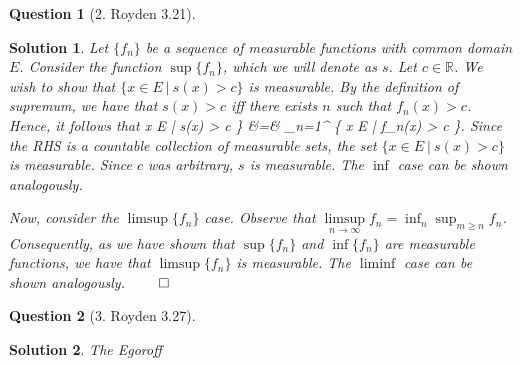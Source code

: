 \documentclass{article} %
\def\eQb#1\eQe{\begin{eqnarray*}#1\end{eqnarray*}}
\theoremstyle{quest}
\newtheorem*{question}{Question}
\newtheorem*{solution}{Solution}
\begin{document}
\pagebreak

\begin{question}[2. Royden 3.21]
\end{question}
\begin{solution}
Let $\{f_n \}$ be a sequence of measurable functions with common domain $E$. Consider the
function $\sup \{ f_n \}$, which we will denote as $s$. Let $c \in \mathbb{R}$. 
We wish to show that $\{ x \in E \> | \> s(x) > c\}$ is measurable. By the definition of supremum,
we have that $s(x) > c$ iff there exists $n$ such that $f_n(x) > c$. Hence, it follows that 
\eQb
\{ x \in E \> | \> s(x) > c \} &=& \bigcup_{n=1}^{\infty} 
\{ x \in E \> | \> f_n(x) > c \}. 
\eQe
Since the RHS is a countable collection of measurable sets, the set 
$\{ x \in E \> | \> s(x) > c \}$ is measurable. Since $c$ was arbitrary, $s$ is measurable. 
The $\inf$ case can be shown analogously.

\smallskip

Now, consider the $\limsup \{ f_n \} $ case. 
Observe that $\underset{n \to \infty}{\limsup}f_n = \inf_{n} 
\sup_{m \geq n}f_n$. Consequently, as we have shown that $\sup\{f_n\}$ and $\inf\{f_n\}$ are 
measurable functions, we have that $\limsup \{ f_n \}$ is measurable. The $\liminf$ case can 
be shown analogously. $\qed$
\end{solution}

\bigskip

\begin{question}[3. Royden 3.27]
\end{question}
\begin{solution}
The Egoroff 
\end{solution}

\bigskip
\end{document}
